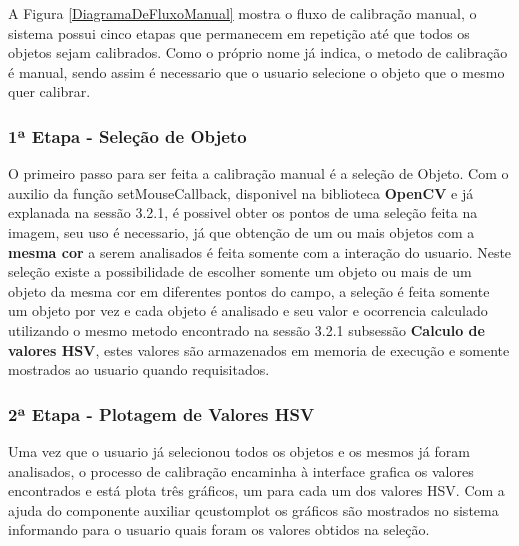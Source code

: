   	  			
   A Figura \ref{DiagramaDeFluxoManual} mostra o fluxo de calibração manual, o sistema possui cinco etapas que permanecem em repetição até que todos os objetos sejam calibrados. Como o próprio nome já indica, o metodo de calibração é manual, sendo assim é necessario que o usuario selecione o objeto que o mesmo quer calibrar.
	
  	\subsubsection{1ª Etapa - Seleção de Objeto}	
  	O primeiro passo para ser feita a calibração manual é a seleção de Objeto. Com o auxilio da função setMouseCallback, disponivel na biblioteca \textbf{OpenCV} e já explanada na sessão 3.2.1, é possivel obter os pontos de uma seleção feita na imagem, seu uso é necessario, já que obtenção de um ou mais objetos com a \textbf{mesma cor} a serem analisados é feita somente com a interação do usuario. Neste seleção existe a possibilidade de escolher somente um objeto ou mais de um objeto da mesma cor em diferentes pontos do campo, a seleção é feita somente um objeto por vez e cada objeto é analisado e seu valor e ocorrencia calculado utilizando o mesmo metodo encontrado na sessão 3.2.1 subsessão \textbf{Calculo de valores HSV}, estes valores são armazenados em memoria de execução e somente mostrados ao usuario quando requisitados. 
  	
  	\subsubsection{2ª Etapa - Plotagem de Valores HSV}	
  	Uma vez que o usuario já selecionou todos os objetos e os mesmos já foram analisados, o processo de calibração encaminha à interface grafica os valores encontrados e está plota três gráficos, um para cada um dos valores HSV.
  	Com a ajuda do componente auxiliar qcustomplot os gráficos são mostrados no sistema informando para o usuario quais foram os valores obtidos na seleção.
  	
